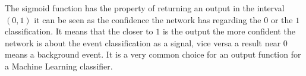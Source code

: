 The sigmoid function has the property of returning an output in the interval
$\left(0,1\right)$ it can be seen as the confidence the network has
regarding the $0$ or the $1$ classification. It means that the closer to $1$
is the output the more confident the network is about the event
classification as a signal, vice versa a result near $0$ means a background
event. It is a very common choice for an output function for a Machine
Learning classifier.
